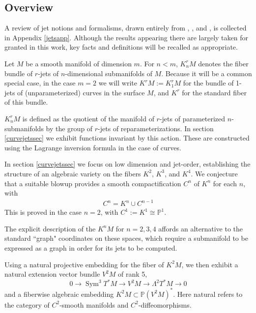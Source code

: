 \documentclass[12pt]{article}
\numberwithin{equation}{section}
\theoremstyle{plain}
\theoremstyle{definition}
\renewcommand{\P}{\mathbb{P}}
\renewcommand{\L}{\Lambda}
\newcommand{\ra}{\rightarrow}
\begin{document}

\subsection{Overview}
A review of jet notions and formalisms, drawn entirely from \cite{olver}, \cite{eds}, and \cite{kms}, is collected in Appendix \ref{jetsapp}. Although the results appearing there are largely taken for granted in this work, key facts and definitions will be recalled as appropriate.

\vspace{1pc}

Let $M$ be a smooth manifold of dimension $m$. For $n< m$, $K^{r}_{n}M$ denotes the fiber bundle of $r$-jets of $n$-dimensional submanifolds of $M$. Because it will be a common special case, in the case $m = 2$ we will write $K^{r}M:=K^{r}_{1}M$ for the bundle of 1-jets of (unparameterized) curves in the surface $M$, and $K^{r}$ for the standard fiber of this bundle.

$K^{r}_{n}M$ is defined as the quotient of the manifold of $r$-jets of parameterized $n$-submanifolds by the group of $r$-jets of reparameterizations. In section \ref{curvejetssec} we exhibit functions invariant by this action. These are constructed using the Lagrange inversion formula in the case of curves.


In section \ref{curvejetssec} we focus on low dimension and jet-order, establishing the structure of an algebraic variety on the fibers $K^{2}$, $K^{3}$, and $K^{4}$. We conjecture that a suitable blowup provides a smooth compactification $C^{n}$ of $K^{n}$ for each $n$, with
\begin{align*}
C^{n}=K^{n}\cup C^{n-1}
\end{align*}
This is proved in the case $n=2$, with $C^{1}:=K^{1}\cong \P^{1}$.

The explicit description of the $K^{n}M$ for $n=2,3,4$ affords an alternative to the standard ``graph" coordinates on these spaces, which require a submanifold to be expressed as a graph in order for its jets to be computed.

Using a natural projective embedding for the fiber of $K^{2}M$, we then exhibit a natural extension vector bundle $V^{2}M$ of rank 5,
\[ 0\ra \operatorname{Sym}^{3}T^{*}M\ra V^{2}M \ra \L^{2}T^{*}M\ra 0 \]
and a fiberwise algebraic embedding $K^{2}M\subset\P (V^{2}M)^*$. Here natural refers to the category of $C^{2}$-smooth manifolds and $C^{2}$-diffeomorphisms.
\end{document}

